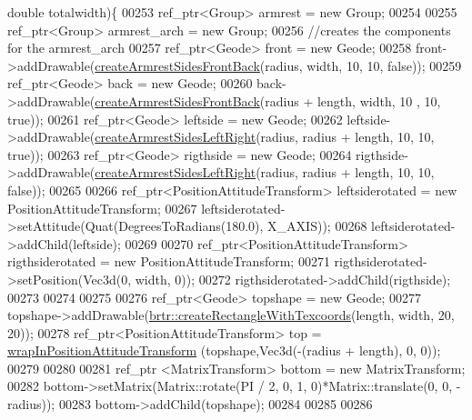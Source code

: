 \begin{DoxyCode}
{      double} totalwidth)\{
00253         ref\_ptr<Group> armrest = \textcolor{keyword}{new} Group;
00254 
00255         ref\_ptr<Group> armrest\_arch = \textcolor{keyword}{new} Group;
00256         \textcolor{comment}{//creates the components for the armrest\_arch}
00257         ref\_ptr<Geode> front = \textcolor{keyword}{new} Geode;
00258         front->addDrawable(\hyperlink{classbrtr_1_1_bench_a28443b856188050680a2c0ab4ad31a93}{createArmrestSidesFrontBack}(radius, width, 10, 10, \textcolor{keyword}{
      false}));
00259         ref\_ptr<Geode> back = \textcolor{keyword}{new} Geode;
00260         back->addDrawable(\hyperlink{classbrtr_1_1_bench_a28443b856188050680a2c0ab4ad31a93}{createArmrestSidesFrontBack}(radius + length, width, 10
      , 10, \textcolor{keyword}{true}));
00261         ref\_ptr<Geode> leftside = \textcolor{keyword}{new} Geode;
00262         leftside->addDrawable(\hyperlink{classbrtr_1_1_bench_afac56bea39f6e5e72140d4512dd711d3}{createArmrestSidesLeftRight}(radius, radius + 
      length, 10, 10, \textcolor{keyword}{true}));
00263         ref\_ptr<Geode> rigthside = \textcolor{keyword}{new} Geode;
00264         rigthside->addDrawable(\hyperlink{classbrtr_1_1_bench_afac56bea39f6e5e72140d4512dd711d3}{createArmrestSidesLeftRight}(radius, radius + 
      length, 10, 10, \textcolor{keyword}{false}));
00265 
00266         ref\_ptr<PositionAttitudeTransform> leftsiderotated = \textcolor{keyword}{new} PositionAttitudeTransform;
00267         leftsiderotated->setAttitude(Quat(DegreesToRadians(180.0), X\_AXIS));
00268         leftsiderotated->addChild(leftside);
00269         
00270         ref\_ptr<PositionAttitudeTransform> rigthsiderotated = \textcolor{keyword}{new} PositionAttitudeTransform;
00271         rigthsiderotated->setPosition(Vec3d(0, width, 0));
00272         rigthsiderotated->addChild(rigthside);
00273 
00274         
00275         
00276         ref\_ptr<Geode> topshape = \textcolor{keyword}{new} Geode;
00277         topshape->addDrawable(\hyperlink{namespacebrtr_a4e91424e74398a612c38a920df0577ef}{brtr::createRectangleWithTexcoords}(length, 
      width, 20, 20));
00278         ref\_ptr<PositionAttitudeTransform> top = \hyperlink{namespacebrtr_a887d7975f37c4334b70e2196735b6678}{wrapInPositionAttitudeTransform}
      (topshape,Vec3d(-(radius + length), 0, 0));
00279 
00280 
00281         ref\_ptr <MatrixTransform> bottom = \textcolor{keyword}{new} MatrixTransform;
00282         bottom->setMatrix(Matrix::rotate(PI / 2, 0, 1, 0)*Matrix::translate(0, 0, -radius));
00283         bottom->addChild(topshape);
00284 
00285 
00286         

\end{DoxyCode}
